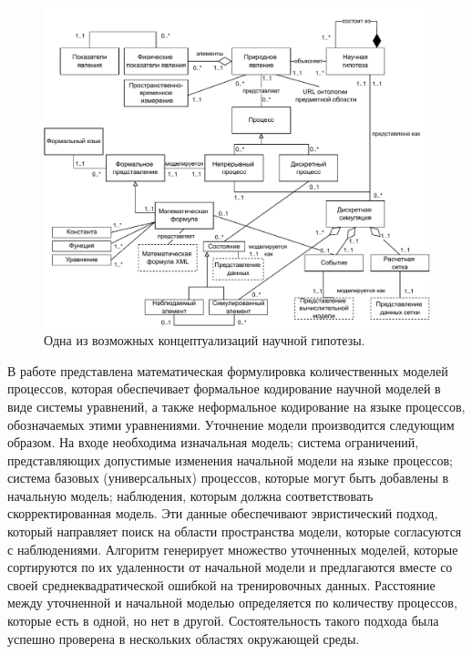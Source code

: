 \begin{figure}[ht]
    \centering
    \includegraphics[width=\linewidth]{images/ScHypoConcept}
    \caption{Одна из возможных концептуализаций научной гипотезы.}\label{fig:ScHypoConcept}
\end{figure}

В работе \cite{asgharbeygi2006inductive} представлена математическая формулировка количественных моделей процессов, 
которая обеспечивает формальное кодирование научной моделей в виде системы уравнений, а также неформальное кодирование 
на языке процессов, обозначаемых этими уравнениями. Уточнение модели производится следующим образом. На входе 
необходима изначальная модель; система ограничений, представляющих допустимые изменения начальной модели на языке 
процессов; система базовых (универсальных) процессов, которые могут быть добавлены в начальную модель; наблюдения, 
которым должна соответствовать скорректированная модель. Эти данные обеспечивают эвристический подход, который 
направляет поиск на области пространства модели, которые согласуются с наблюдениями. Алгоритм генерирует множество 
уточненных моделей, которые сортируются по их удаленности от начальной модели и предлагаются вместе со своей 
среднеквадратической ошибкой на тренировочных данных. Расстояние между уточненной и начальной моделью определяется по 
количеству процессов, которые есть в одной, но нет в другой. Состоятельность такого подхода была успешно проверена в 
нескольких областях окружающей среды.

